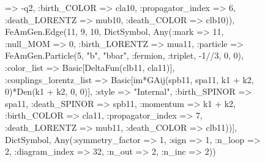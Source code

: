 \documentclass{revtex4}
\begin{document}
\begin{figure}[!htb]
\begin{center}
{=> -q2, :birth_COLOR => cla10, :propagator_index => 6, :death_LORENTZ => mub10, :death_COLOR => clb10)), FeAmGen.Edge(11, 9, 10, Dict{Symbol, Any}(:mark => 11, :null_MOM => 0, :birth_LORENTZ => mua11, :particle => FeAmGen.Particle(5, "b", "bbar", :fermion, :triplet, -1//3, 0, 0), :color_list => Basic[DeltaFun(clb11, cla11)], :couplings_lorentz_list => Basic[im*GAij(spb11, spa11, k1 + k2, 0)*Den(k1 + k2, 0, 0)], :style => "Internal", :birth_SPINOR => spa11, :death_SPINOR => spb11, :momentum => k1 + k2, :birth_COLOR => cla11, :propagator_index => 7, :death_LORENTZ => mub11, :death_COLOR => clb11))], Dict{Symbol, Any}(:symmetry_factor => 1, :sign => 1, :n_loop => 2, :diagram_index => 32, :n_out => 2, :n_inc => 2)) 
}
\end{center}
\end{figure}
\end{document}
